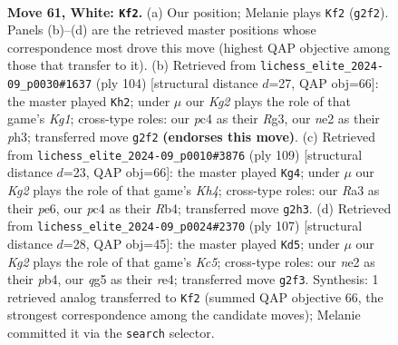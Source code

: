 \documentclass[11pt]{article}
\begin{document}
\clearpage

\begin{figure}[p]\centering
\begin{subfigure}{0.46\textwidth}\centering
\resizebox{\linewidth}{!}{%
\newchessgame
\chessboard[
  setfen={8/p5k1/1p6/6q1/P1p5/RP6/4n1K1/8 w - - 4 61},
  showmover=false,
  pgfstyle=straightmove, color=movearrow, markmove={g2-f2}
]}
\caption{}
\end{subfigure}\hfill
\begin{subfigure}{0.46\textwidth}\centering
\resizebox{\linewidth}{!}{%
\newchessgame
\chessboard[
  setfen={8/pp6/8/8/1P3k2/P5Rp/5P2/3q2K1 w - - 4 53},
  showmover=false,
  pgfstyle=straightmove, color=movearrow, markmove={g1-h2}
]}
\caption{}
\end{subfigure}
\\[4pt]
\begin{subfigure}{0.46\textwidth}\centering
\resizebox{\linewidth}{!}{%
\newchessgame
\chessboard[
  setfen={7Q/1p6/4P1p1/7k/1r3P1P/4K3/p7/8 b - - 4 55},
  showmover=false,
  pgfstyle=straightmove, color=movearrow, markmove={h5-g4}
]}
\caption{}
\end{subfigure}\hfill
\begin{subfigure}{0.46\textwidth}\centering
\resizebox{\linewidth}{!}{%
\newchessgame
\chessboard[
  setfen={8/8/6p1/8/1Pk1Rp1P/6p1/3K2P1/5r2 b - - 5 54},
  showmover=false,
  pgfstyle=straightmove, color=movearrow, markmove={c4-d5}
]}
\caption{}
\end{subfigure}
\caption{\textbf{Move 61, White: \texttt{Kf2}.} (a) Our position; Melanie plays \texttt{Kf2} (\texttt{g2f2}). Panels (b)--(d) are the retrieved master positions whose correspondence most drove this move (highest QAP objective among those that transfer to it). (b) Retrieved from \texttt{lichess\_elite\_2024-09\_p0030\#1637} (ply 104) [structural distance $d$=27, QAP obj=66]: the master played \texttt{Kh2}; under $\mu$ our \emph{Kg2} plays the role of that game's \emph{Kg1}; cross-type roles: our \emph{p}c4 as their \emph{R}g3, our \emph{n}e2 as their \emph{p}h3; transferred move \texttt{g2f2} \textbf{(endorses this move)}. (c) Retrieved from \texttt{lichess\_elite\_2024-09\_p0010\#3876} (ply 109) [structural distance $d$=23, QAP obj=66]: the master played \texttt{Kg4}; under $\mu$ our \emph{Kg2} plays the role of that game's \emph{Kh4}; cross-type roles: our \emph{R}a3 as their \emph{p}e6, our \emph{p}c4 as their \emph{R}b4; transferred move \texttt{g2h3}. (d) Retrieved from \texttt{lichess\_elite\_2024-09\_p0024\#2370} (ply 107) [structural distance $d$=28, QAP obj=45]: the master played \texttt{Kd5}; under $\mu$ our \emph{Kg2} plays the role of that game's \emph{Kc5}; cross-type roles: our \emph{n}e2 as their \emph{p}b4, our \emph{q}g5 as their \emph{r}e4; transferred move \texttt{g2f3}. Synthesis: 1 retrieved analog transferred to \texttt{Kf2} (summed QAP objective 66, the strongest correspondence among the candidate moves); Melanie committed it via the \texttt{search} selector.}
\label{fig:thought-m120}
\end{figure}
\end{document}
